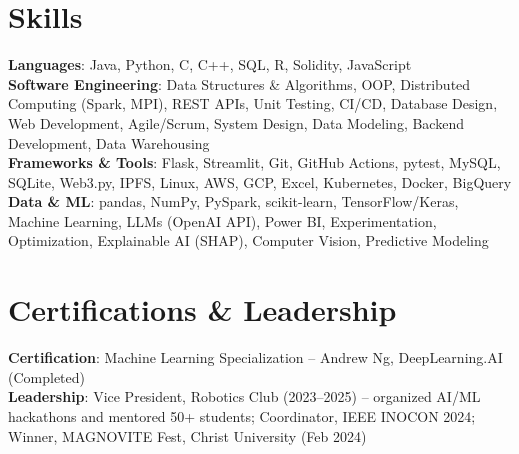 \documentclass[letterpaper,11pt]{article}
\begin{document}
\section{Skills}
 \begin{itemize}[leftmargin=0.15in, label={}]
    \small{\item{
     \textbf{Languages}{: Java, Python, C, C++, SQL, R, Solidity, JavaScript} \\
     \textbf{Software Engineering}{: Data Structures \& Algorithms, OOP, Distributed Computing (Spark, MPI), REST APIs, Unit Testing, CI/CD, Database Design, Web Development, Agile/Scrum, System Design, Data Modeling, Backend Development, Data Warehousing} \\
     \textbf{Frameworks \& Tools}{: Flask, Streamlit, Git, GitHub Actions, pytest, MySQL, SQLite, Web3.py, IPFS, Linux, AWS, GCP, Excel, Kubernetes, Docker, BigQuery} \\
     \textbf{Data \& ML}{: pandas, NumPy, PySpark, scikit-learn, TensorFlow/Keras, Machine Learning, LLMs (OpenAI API), Power BI, Experimentation, Optimization, Explainable AI (SHAP), Computer Vision, Predictive Modeling}
    }}
 \end{itemize}

\section{Certifications \& Leadership}
 \begin{itemize}[leftmargin=0.15in, label={}]
    \small{\item{
     \textbf{Certification}{: Machine Learning Specialization -- Andrew Ng, DeepLearning.AI (Completed)} \\
     \textbf{Leadership}{: Vice President, Robotics Club (2023--2025) -- organized AI/ML hackathons and mentored 50+ students; Coordinator, IEEE INOCON 2024; Winner, MAGNOVITE Fest, Christ University (Feb 2024)}
    }}
 \end{itemize}
\end{document}
